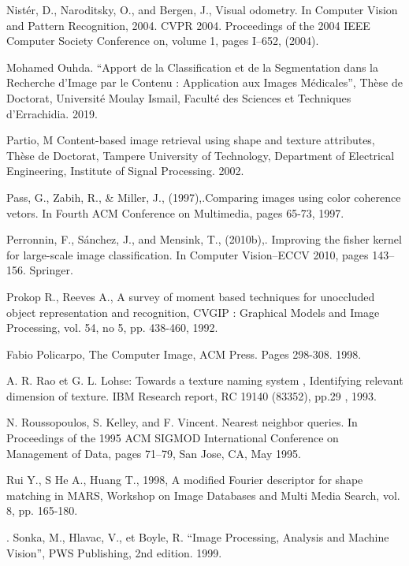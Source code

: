 \documentclass[
openany,
11pt, %
french, %
singlespacing, %
headsepline, %
]{MastersDoctoralThesis} %
\begin{document}
\begin{thebibliography}{widest entry}
	  Nistér, D., Naroditsky, O., and Bergen, J., Visual odometry. In Computer Vision and Pattern Recognition, 2004. CVPR 2004. Proceedings of the 2004 IEEE Computer Society Conference on, volume 1, pages I–652, (2004).
	
	
	  Mohamed Ouhda. “Apport de la Classification et de la Segmentation dans la Recherche d’Image par le Contenu : Application aux
	Images Médicales”, Thèse de Doctorat, Université Moulay Ismail, Faculté des Sciences et Techniques d’Errachidia. 2019.
	
	 Partio, M Content-based image retrieval using shape and texture attributes, Thèse de Doctorat, Tampere University of Technology, Department of Electrical Engineering, Institute of Signal Processing. 2002.
	
	  Pass, G., Zabih, R., \& Miller, J., (1997),.Comparing images using color coherence vetors. In Fourth ACM Conference on Multimedia, pages 65-73, 1997.
	
	  Perronnin, F., Sánchez, J., and Mensink, T., (2010b),. Improving the fisher kernel for large-scale image classification. In Computer Vision–ECCV 2010, pages 143–156. Springer.
	
	  Prokop R., Reeves A., A survey of moment based techniques for unoccluded object representation and recognition, CVGIP : Graphical Models and Image Processing, vol. 54, no 5, pp. 438-460, 1992.
	
	 Fabio Policarpo, The Computer Image, ACM Press. Pages 298-308. 1998.
	
	  A. R. Rao et G. L. Lohse: Towards a texture naming system , Identifying relevant dimension of texture. IBM Research report, RC 19140 (83352), pp.29 , 1993.
	
	 N. Roussopoulos, S. Kelley, and F. Vincent. Nearest neighbor queries. In Proceedings of the 1995 ACM SIGMOD International Conference on Management of Data, pages 71–79, San Jose, CA, May 1995. 
	
	 Rui Y., S He A., Huang T., 1998, A modified Fourier descriptor for shape matching in
	MARS, Workshop on Image Databases and Multi Media Search, vol. 8, pp. 165-180.
	
	
	 . Sonka, M., Hlavac, V., et Boyle, R. “Image Processing, Analysis and Machine Vision”, PWS Publishing, 2nd edition. 1999.
	

\end{thebibliography}
\end{document}
